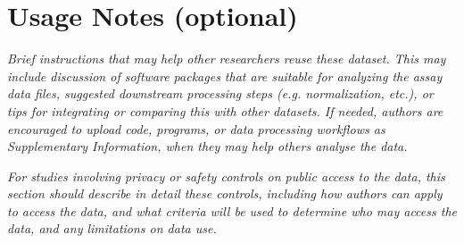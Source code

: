 \section{Usage Notes (optional)}

\textit{Brief instructions that may help other researchers reuse these dataset.  This may include discussion of software packages that are suitable for analyzing the assay data files, suggested downstream processing steps (e.g. normalization, etc.), or tips for integrating or comparing this with other datasets.  If needed, authors are encouraged to upload code, programs, or data processing workflows as Supplementary Information, when they may help others analyse the data.}

\textit{For studies involving privacy or safety controls on public access to the data, this section should describe in detail these controls, including how authors can apply to access the data, and what criteria will be used to determine who may access the data, and any limitations on data use.  }
